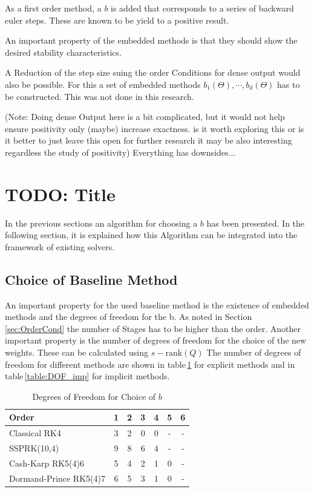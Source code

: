 \documentclass[a4paper]{scrartcl}
\numberwithin{equation}{section}
\theoremstyle{plain}
\theoremstyle{definition}
\numberwithin{theorem}{section}
\newcommand{\1}{\mathbbm{1}}
\begin{document}
As a first order method, a $b$ is added that corresponds to a series of backward euler steps. These are known to be yield to a positive result.

An important property of the embedded methods is that they should show the desired stability characteristics.

A Reduction of the step size suing the order Conditions for dense output would also be possible. For this a set of embedded methods $b_1(\Theta),\cdots,b_d(\Theta)$ has to be constructed. This was not done in this research.

(Note: Doing dense Output here is a bit complicated, but it would not help ensure positivity only (maybe) increase exactness.  is it worth exploring this or is it better to just leave this open for further research it may be also interesting regardless the study of positivity)
Everything has downsides...
 
\section{TODO: Title} \label{sec:integration}

In the previous sections an algorithm for choosing a $b$ has been presented. 
In the following section, it is explained how this Algorithm can be integrated into the framework of existing solvers.

\subsection{Choice of Baseline Method}
An important property for the used baseline method is the existence of embedded methods and the degrees of freedom for the b.
As noted in Section\,\ref{sec:OrderCond} the number of Stages has to be higher than the order. 
Another important property is the number of degrees of freedom for the choice of the new weights. 
These can be calculated using $s-\mathrm{rank}(Q)$%
The number of degrees of freedom for different methods are shown in table\,\ref{table:DOF_exp} for explicit methods and in table\,\ref{table:DOF_imp} for implicit methods.

\begin{table}[h!]
\centering    %
\begin{tabular}{|l |c c c c c c |} 
 \hline 
Order &1&2&3&4&5&6 \\ 
 \hline Classical RK4&3&2&0&0& - & -  \\ 
 SSPRK(10,4)&9&8&6&4& - & -  \\ 
 Cash-Karp RK5(4)6&5&4&2&1&0& -  \\ 
 Dormand-Prince RK5(4)7&6&5&3&1&0& -  \\ 
 \hline 
 \end{tabular}
 \caption{Degrees of Freedom for Choice of $b$} %
 \label{table:DOF_exp}
 \end{table}
 
\end{document}
